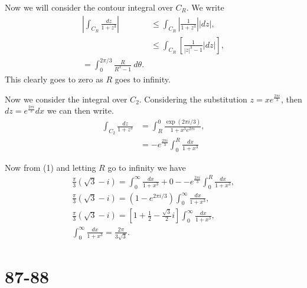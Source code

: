 \documentclass{article}
\begin{document}
Now we will consider the contour integral over $C_R$. We write
\begin{align*}
    |\int_{C_R} \frac{dz}{1 + z^3}| & \leq \int_{C_R} \left|\frac{1}{1 + z^3}\right||dz|,   \\
                                    & \leq \int_{C_R} \left[\frac{1}{|z|^3 - 1}|dz|\right], \\
    = \int_0^{2\pi/3} \frac{R}{R^3 - 1} \ d\theta.
\end{align*}
This clearly goes to zero as $R$ goes to infinity.

Now we consider the integral over $C_2$. Considering the substitution
$z = xe^{\frac{2\pi i}{3}}$, then $dz = e^{\frac{2\pi i}{3}}dx$ we can then write.
\begin{align*}
    \int_{C_2} \frac{dz}{1 + z^3} & = \int_R^0 \frac{\exp(2\pi i/3)}{1 + x^3e^{2\pi i}}, \\
                                  & = -e^{\frac{2\pi i}{3}} \int_0^R \frac{dx}{1 + x^3}
\end{align*}

Now from (1) and letting $R$ go to infinity we have
\begin{gather*}
    \frac{\pi}{3}(\sqrt{3} - i) = \int_0^\infty \frac{dx}{1 + x^3} + 0 - -e^{\frac{2\pi i}{3}} \int_0^R \frac{dx}{1 + x^3},\\
    \frac{\pi}{3}(\sqrt{3} - i) = \left(1 - e^{2\pi i/3}\right)\int_0^\infty \frac{dx}{1 + x^3}, \\
    \frac{\pi}{3}(\sqrt{3} - i) = \left[1 + \frac{1}{2} - \frac{\sqrt{3}}{2}i\right]\int_0^\infty \frac{dx}{1 + x^3}, \\
    \int_0^\infty \frac{dx}{1 + x^3} = \frac{2\pi}{3\sqrt{3}}.
\end{gather*}

\section*{87-88}
\end{document}
